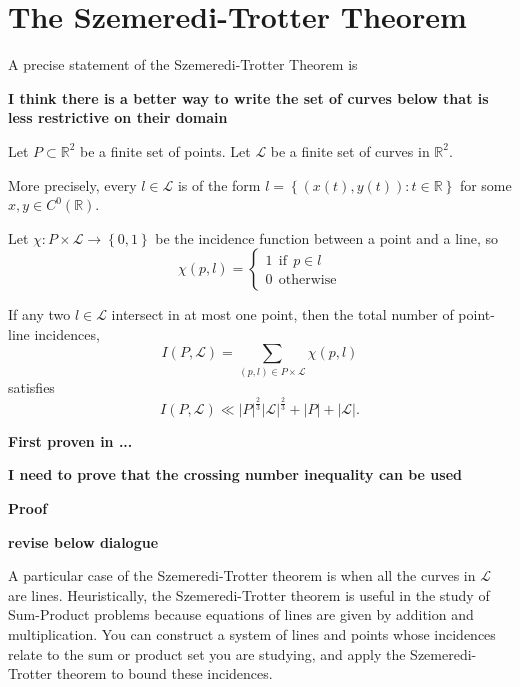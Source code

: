\documentclass[12pt]{amsart}
\begin{document}
\section{The Szemeredi-Trotter Theorem}

A precise statement of the Szemeredi-Trotter Theorem is

\textbf{I think there is a better way to write the set of curves below that is less restrictive on their domain}

\begin{theorem}
Let \(P \subset \mathbb{R} ^{2}\) be a finite set of points. Let \(\mathcal{L} \) be a finite set of curves in \(\mathbb{R} ^{2}\). 

More precisely,
every \(l \in \mathcal{L} \) is of the form \(l = \left\{ (x(t),y(t)) : t\in \mathbb{R}  \right\} \) for some \(x,y \in C^{0}(\mathbb{R} )\). 

Let \(\chi : P \times \mathcal{L}  \to \left\{ 0,1 \right\} \) be the incidence function
between a point and a line, so
\[
\chi(p,l) = 
\begin{cases}
1 ~ ~ \text{if} ~ ~ p\in l\\
0 ~ ~ \text{otherwise} 
\end{cases}
\]

If any two \( l \in \mathcal{L} \) intersect in at most one point,
then the total number of point-line incidences,
\[
    I(P, \mathcal{L} ) = \sum _{(p,l)\in P \times \mathcal{L} } \chi(p,l)
\]
satisfies
\[
    I(P,\mathcal{L} ) \ll  \left\lvert P \right\rvert^{\frac{2}{3} } \left\lvert \mathcal{L}  \right\rvert ^{\frac{2}{3} } + \left\lvert P \right\rvert + \left\lvert \mathcal{L}  \right\rvert 
.\]
\end{theorem}

\textbf{First proven in ...}

\textbf{I need to prove that the crossing number inequality can be used}

\textbf{Proof}

\textbf{revise below dialogue}

A particular case of the Szemeredi-Trotter theorem is when all the curves in \(\mathcal{L} \) are lines.
Heuristically, the Szemeredi-Trotter theorem is useful in the study of Sum-Product problems
because equations of lines are given by addition and multiplication. You can construct a system of
lines and points whose incidences relate to the sum or product set you are studying, and apply the Szemeredi-Trotter
theorem to bound these incidences.
\end{document}
